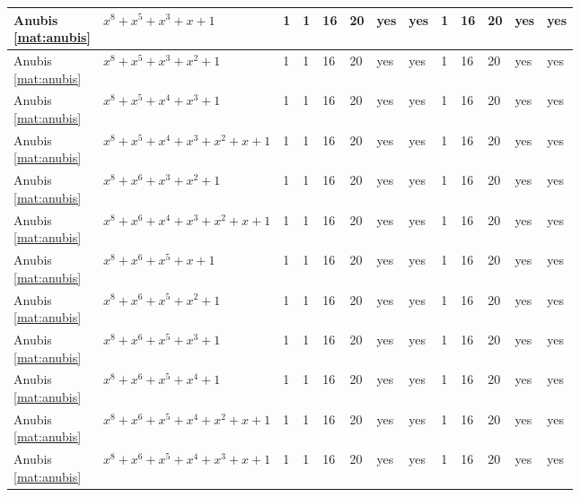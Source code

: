 \begin{tiny}
\begin{longtable}{|l|l|l|l|l|l|l|l|l|l|l|l|l|}
\shortstack{Anubis \\ \eqref{mat:anubis}} & $x^8 + x^5 + x^3 + x + 1$ & 1 & 1 & 16 & 20 & yes & yes & 1 & 16 & 20 & yes & yes \\ \hline
\shortstack{Anubis \\ \eqref{mat:anubis}} & $x^8 + x^5 + x^3 + x^2 + 1$ & 1 & 1 & 16 & 20 & yes & yes & 1 & 16 & 20 & yes & yes \\ \hline
\shortstack{Anubis \\ \eqref{mat:anubis}} & $x^8 + x^5 + x^4 + x^3 + 1$ & 1 & 1 & 16 & 20 & yes & yes & 1 & 16 & 20 & yes & yes \\ \hline
\shortstack{Anubis \\ \eqref{mat:anubis}} & $x^8 + x^5 + x^4 + x^3 + x^2 + x + 1$ & 1 & 1 & 16 & 20 & yes & yes & 1 & 16 & 20 & yes & yes \\ \hline
\shortstack{Anubis \\ \eqref{mat:anubis}} & $x^8 + x^6 + x^3 + x^2 + 1$ & 1 & 1 & 16 & 20 & yes & yes & 1 & 16 & 20 & yes & yes \\ \hline
\shortstack{Anubis \\ \eqref{mat:anubis}} & $x^8 + x^6 + x^4 + x^3 + x^2 + x + 1$ & 1 & 1 & 16 & 20 & yes & yes & 1 & 16 & 20 & yes & yes \\ \hline
\shortstack{Anubis \\ \eqref{mat:anubis}} & $x^8 + x^6 + x^5 + x + 1$ & 1 & 1 & 16 & 20 & yes & yes & 1 & 16 & 20 & yes & yes \\ \hline
\shortstack{Anubis \\ \eqref{mat:anubis}} & $x^8 + x^6 + x^5 + x^2 + 1$ & 1 & 1 & 16 & 20 & yes & yes & 1 & 16 & 20 & yes & yes \\ \hline
\shortstack{Anubis \\ \eqref{mat:anubis}} & $x^8 + x^6 + x^5 + x^3 + 1$ & 1 & 1 & 16 & 20 & yes & yes & 1 & 16 & 20 & yes & yes \\ \hline
\shortstack{Anubis \\ \eqref{mat:anubis}} & $x^8 + x^6 + x^5 + x^4 + 1$ & 1 & 1 & 16 & 20 & yes & yes & 1 & 16 & 20 & yes & yes \\ \hline
\shortstack{Anubis \\ \eqref{mat:anubis}} & $x^8 + x^6 + x^5 + x^4 + x^2 + x + 1$ & 1 & 1 & 16 & 20 & yes & yes & 1 & 16 & 20 & yes & yes \\ \hline
\shortstack{Anubis \\ \eqref{mat:anubis}} & $x^8 + x^6 + x^5 + x^4 + x^3 + x + 1$ & 1 & 1 & 16 & 20 & yes & yes & 1 & 16 & 20 & yes & yes \\ \hline

\end{longtable}
\end{tiny}
